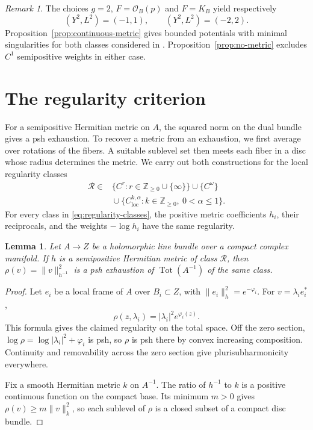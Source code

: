 \documentclass[11pt]{amsart}
\newtheorem{lemma}[theorem]{Lemma}
\theoremstyle{definition}
\theoremstyle{remark}
\newtheorem{remark}[theorem]{Remark}
\numberwithin{equation}{section}
\newcommand{\OO}{\mathcal O}
\newcommand{\Tot}{\operatorname{Tot}}
\begin{document}
\begin{remark}\label{rem:minimal}
The choices $g=2$, $F=\OO_B(p)$ and $F=K_B$ yield respectively
\[
 (Y^2,L^2)=(-1,1),\qquad (Y^2,L^2)=(-2,2).
\]
Proposition~\ref{prop:continuous-metric} gives bounded potentials
with minimal singularities for both classes considered in
\cite[Section~4]{Zhang2025}. Proposition~\ref{prop:no-metric}
excludes $C^1$ semipositive weights in either case.
\end{remark}

\section{The regularity criterion}\label{sec:radius}

For a semipositive Hermitian metric on $A$, the squared norm on the
dual bundle gives a psh exhaustion. To recover a metric from an
exhaustion, we first average over rotations of the fibers. A suitable
sublevel set then meets each fiber in a disc whose radius determines
the metric. We carry out both constructions for the local regularity
classes
\begin{equation}\label{eq:regularity-classes}
\begin{split}
 \mathcal R\in{}&\{C^r:r\in\mathbb Z_{\ge0}\cup\{\infty\}\}
 \cup\{C^\omega\}\\
 &{}\cup\{C^{k,\alpha}_{\mathrm{loc}}:
          k\in\mathbb Z_{\ge0},\ 0<\alpha\le1\}.
\end{split}
\end{equation}
For every class in \eqref{eq:regularity-classes}, the positive metric
coefficients $h_i$, their reciprocals, and the weights
$-\log h_i$ have the same regularity.

\begin{lemma}\label{lem:norm}
Let $A\to Z$ be a holomorphic line bundle over a compact complex
manifold. If $h$ is a semipositive Hermitian metric of class
$\mathcal R$, then $\rho(v)=\|v\|_{h^{-1}}^2$ is a psh exhaustion
of $\Tot(A^{-1})$ of the same class.
\end{lemma}
\begin{proof}
Let $e_i$ be a local frame of $A$ over $B_i\subset Z$, with
$\|e_i\|_h^2=e^{-\varphi_i}$. For $v=\lambda_i e_i^*$,
\begin{equation}\label{eq:local-norm}
 \rho(z,\lambda_i)=|\lambda_i|^2e^{\varphi_i(z)}.
\end{equation}
This formula gives the claimed regularity on the total space.
Off the zero section, $\log\rho=\log|\lambda_i|^2+\varphi_i$ is psh,
so $\rho$ is psh there by convex increasing composition.
Continuity and removability across the zero section give
plurisubharmonicity everywhere.

Fix a smooth Hermitian metric $k$ on $A^{-1}$. The ratio of $h^{-1}$
to $k$ is a positive continuous function on the compact base. Its
minimum $m>0$ gives $\rho(v)\ge m\|v\|_k^2$, so each sublevel of
$\rho$ is a closed subset of a compact disc bundle.
\end{proof}
\end{document}
